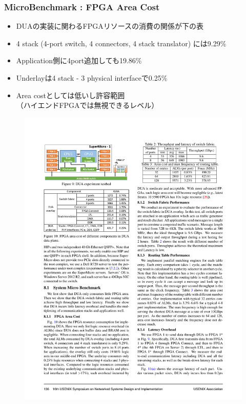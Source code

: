 \documentclass[dvipdfmx,9pt,notheorems]{beamer}
\theoremstyle{definition}
\begin{document}
\begin{frame}\frametitle{MicroBenchmark : FPGA Area Cost}
	\begin{itemize}
			\item DUAの実装に関わるFPGAリソースの消費の関係が下の表
			\item 4 stack (4-port switch, 4 connectors, 4 stack translator) には9.29\%
			\item Application側に4port追加しても19.86\%
			\item Underlayは4 stack - 3 physical interfaceで0.25\%
			\item Area costとしては低いし許容範囲\\（ハイエンドFPGAでは無視できるレベル）
	\end{itemize}
  \begin{figure}[htb]
		\includegraphics[scale=1.0]{fig/figure10.pdf}
  \end{figure}
\pnote{
}
\end{frame}
\end{document}
